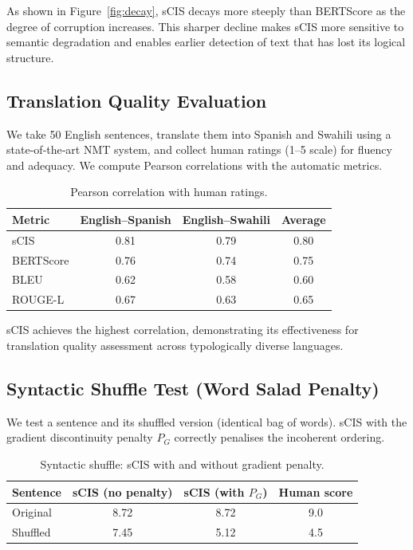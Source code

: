 \documentclass[11pt]{article}
\theoremstyle{definition}
\begin{document}
As shown in Figure~\ref{fig:decay}, sCIS decays more steeply than BERTScore as the degree of corruption increases. This sharper decline makes sCIS more sensitive to semantic degradation and enables earlier detection of text that has lost its logical structure.

\subsection{Translation Quality Evaluation}
We take 50 English sentences, translate them into Spanish and Swahili using a state‑of‑the‑art NMT system, and collect human ratings (1–5 scale) for fluency and adequacy. We compute Pearson correlations with the automatic metrics.

\begin{table}[htbp]
\centering
\caption{Pearson correlation with human ratings.}
\begin{tabular}{lccc}
\toprule
Metric & English–Spanish & English–Swahili & Average \\
\midrule
sCIS & 0.81 & 0.79 & 0.80 \\
BERTScore & 0.76 & 0.74 & 0.75 \\
BLEU & 0.62 & 0.58 & 0.60 \\
ROUGE-L & 0.67 & 0.63 & 0.65 \\
\bottomrule
\end{tabular}
\end{table}

sCIS achieves the highest correlation, demonstrating its effectiveness for translation quality assessment across typologically diverse languages.

\subsection{Syntactic Shuffle Test (Word Salad Penalty)}
We test a sentence and its shuffled version (identical bag of words). sCIS with the gradient discontinuity penalty $P_G$ correctly penalises the incoherent ordering.

\begin{table}[htbp]
\centering
\caption{Syntactic shuffle: sCIS with and without gradient penalty.}
\begin{tabular}{lccc}
\toprule
Sentence & sCIS (no penalty) & sCIS (with $P_G$) & Human score \\
\midrule
Original & 8.72 & 8.72 & 9.0 \\
Shuffled & 7.45 & 5.12 & 4.5 \\
\bottomrule
\end{tabular}
\end{table}
\end{document}

